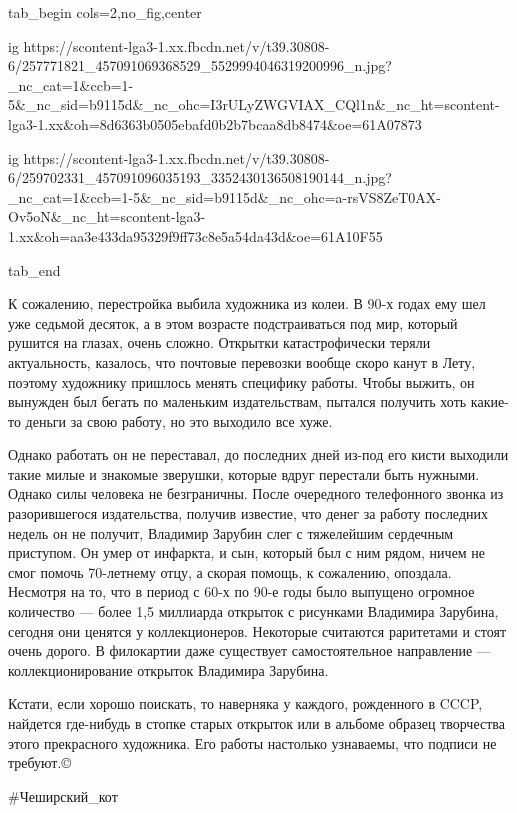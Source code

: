 
\ifcmt

tab_begin cols=2,no_fig,center

  ig https://scontent-lga3-1.xx.fbcdn.net/v/t39.30808-6/257771821_457091069368529_5529994046319200996_n.jpg?_nc_cat=1&ccb=1-5&_nc_sid=b9115d&_nc_ohc=I3rULyZWGVIAX_CQl1n&_nc_ht=scontent-lga3-1.xx&oh=8d6363b0505ebafd0b2b7bcaa8db8474&oe=61A07873

  ig https://scontent-lga3-1.xx.fbcdn.net/v/t39.30808-6/259702331_457091096035193_3352430136508190144_n.jpg?_nc_cat=1&ccb=1-5&_nc_sid=b9115d&_nc_ohc=a-rsVS8ZeT0AX-Ov5oN&_nc_ht=scontent-lga3-1.xx&oh=aa3e433da95329f9ff73c8e5a54da43d&oe=61A10F55

tab_end
\fi

К сожалению, перестройка выбила художника из колеи. В 90-х годах ему шел уже
седьмой десяток, а в этом возрасте подстраиваться под мир, который рушится на
глазах, очень сложно. Открытки катастрофически теряли актуальность, казалось,
что почтовые перевозки вообще скоро канут в Лету, поэтому художнику пришлось
менять специфику работы. Чтобы выжить, он вынужден был бегать по маленьким
издательствам, пытался получить хоть какие-то деньги за свою работу, но это
выходило все хуже. 

\begin{multicols}{2}
\end{multicols}

Однако работать он не переставал, до последних дней из-под его кисти выходили
такие милые и знакомые зверушки, которые вдруг перестали быть нужными. Однако
силы человека не безграничны. После очередного телефонного звонка из
разорившегося издательства, получив известие, что денег за работу последних
недель он не получит, Владимир Зарубин слег с тяжелейшим сердечным приступом.
Он умер от инфаркта, и сын, который был с ним рядом, ничем не смог помочь
70-летнему отцу, а скорая помощь, к сожалению, опоздала. Несмотря на то, что в
период с 60-х по 90-е годы было выпущено огромное количество — более 1,5
миллиарда открыток с рисунками Владимира Зарубина, сегодня они ценятся у
коллекционеров. Некоторые считаются раритетами и стоят очень дорого. В
филокартии даже существует самостоятельное направление — коллекционирование
открыток Владимира Зарубина. 

Кстати, если хорошо поискать, то наверняка у каждого, рожденного в CCCP,
найдется где-нибудь в стопке старых открыток или в альбоме образец творчества
этого прекрасного художника. Его работы настолько узнаваемы, что подписи не
требуют.©️

\#Чеширский\_кот
